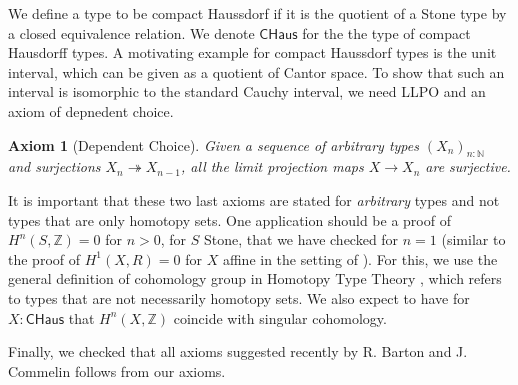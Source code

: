 \documentclass[letterpaper]{../../util/easychair}
\newtheorem{axiom}{Axiom}
\newcommand{\N}{\mathbb{N}}
\newcommand{\CHaus}{\mathsf{CHaus}}
\newcommand{\Noo}{\N_{\infty}}
\newcommand{\ints}{\mathbb{Z}}
\begin{document}
We define a type to be compact Haussdorf if it is the quotient of a Stone type by a closed equivalence relation. 
We denote $\CHaus$ for the the type of compact Hausdorff types. 
A motivating example for compact Haussdorf types is the unit interval, which can be given as a quotient of Cantor space. 
To show that such an interval is isomorphic to the standard Cauchy interval, 
we need LLPO and an axiom of depnedent choice. 
\begin{axiom}[Dependent Choice]
  Given a sequence of arbitrary types $(X_n)_{n:\mathbb N}$ and surjections $X_n \twoheadrightarrow X_{n-1}$, 
  all the limit projection maps $X \to X_n$ are surjective. 
\end{axiom}


It is important that these two last axioms are stated for {\em arbitrary} types and not types that are only
homotopy sets. One application should be a proof of $H^n(S,\ints) = 0$ for $n>0$, for $S$ Stone,
that we have checked for $n = 1$ (similar to the proof of $H^1(X,R) = 0$ for $X$ affine in the setting of \cite{draft}).
For this, we use the general definition of cohomology group in Homotopy Type Theory \cite{hott}, which refers to
types that are not necessarily homotopy sets.
We also expect to have for $X:\CHaus$ that $H^n(X,\ints)$ coincide with singular cohomology.

 Finally, we checked that all axioms suggested recently by R. Barton and J. Commelin \cite{bc24} follows from our axioms.



%
%





\printbibliography
\end{document}
